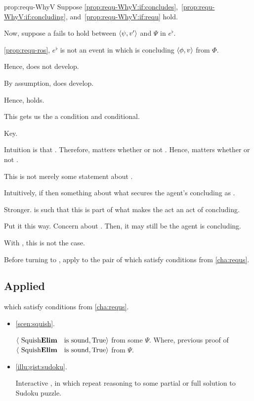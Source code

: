 \begin{note}
  \begin{argument}{prop:requ-WhyV}
    Suppose \ref{prop:requ-WhyV:if:concludes},~\ref{prop:requ-WhyV:if:concluding}, and~\ref{prop:requ-WhyV:if:requ} hold.

    Now, suppose a \ros{} fails to hold between \(\langle \psi, v' \rangle\) and \(\Psi\) in \(e^{\flat}\).

    \autoref{prop:requ-ros}, \(e^{\flat}\) is not an event in which \vAgent{} is concluding \(\langle \phi, v \rangle\) from \(\Phi\).

    Hence, does not develop.

    By assumption, does develop.

    Hence, \ros{} holds.

    This gets us the a condition and conditional.
  \end{argument}
\end{note}

\begin{note}
  Key.

  Intuition is that \sR[concluding]{}.
  Therefore, matters whether or not \fc{}.
  Hence, matters whether or not \ros{}.
\end{note}

\begin{note}
  This is not merely some statement about \sR[concluding]{}.

  Intuitively, if \sR[concluding]{} then something about what secures the agent's concluding as .

  Stronger.
  \requ{} is such that this is part of what makes the act an act of concluding.

  Put it this way.
  Concern about .
  Then, it may still be the agent is concluding.

  With \requ{}, this is not the case.
\end{note}

\begin{note}
  Before turning to \issueConstraint{}, apply to the pair of  which satisfy conditions from \autoref{cha:requs}.
\end{note}

\subsection{Applied}
\label{sec:consequences}


\begin{note}
   which satisfy conditions from \autoref{cha:requs}.
  \begin{itemize}
  \item
    \autoref{scen:squish}.

    \(\pv{\text{\sqE{} is sound}}{\text{True}}\) from some \poP{} \(\Psi\).
    Where, previous proof of \(\pv{\text{\sqE{} is sound}}{\text{True}}\) from \(\Psi\).
  \item
    \autoref{illu:gist:sudoku}.

    Interactive , in which  repeat reasoning to some partial or full solution to Sudoku puzzle.
  \end{itemize}
\end{note}

